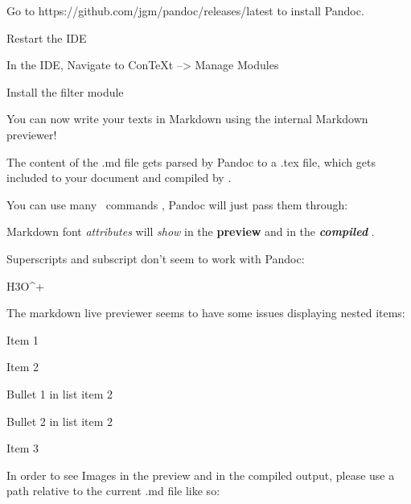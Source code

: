 \startsectionlevel[title={Install Pandoc},reference={install-pandoc}]

\startitemize[packed]
\item
  Go to https://github.com/jgm/pandoc/releases/latest to install Pandoc.
\item
  Restart the IDE
\item
  In the IDE, Navigate to ConTeXt --> Manage Modules
\item
  Install the filter module
\stopitemize

\stopsectionlevel

\startsectionlevel[title={Compile Markdown -> TeX ->
PDF},reference={compile-markdown---tex---pdf}]

You can now write your texts in Markdown using the internal Markdown
previewer!

The content of the .md file gets parsed by Pandoc to a .tex file, which
gets included to your document and compiled by \ConTeXt.

You can use many \ConTeXt~commands \cite{hagen}, Pandoc will just pass
them through:

\startsectionlevel[title={Text},reference={text}]

\startblockquote
Markdown font {\em attributes} will {\em show} in the {\bf preview} and
in the {\bf {\em compiled}} .
\stopblockquote

Superscripts and subscript don't seem to work with Pandoc:

H3O^+

\stopsectionlevel

\startsectionlevel[title={Itemize},reference={itemize}]

The markdown live previewer seems to have some issues displaying nested
items:

\startitemize[packed]
\item
  Item 1
\item
  Item 2
  \startitemize[packed]
  \item
    Bullet 1 in list item 2
  \item
    Bullet 2 in list item 2
  \stopitemize
\item
  Item 3
\stopitemize

\stopsectionlevel

\startsectionlevel[title={Images},reference={images}]

In order to see Images in the preview and in the compiled output, please
use a path relative to the current .md file like so:

